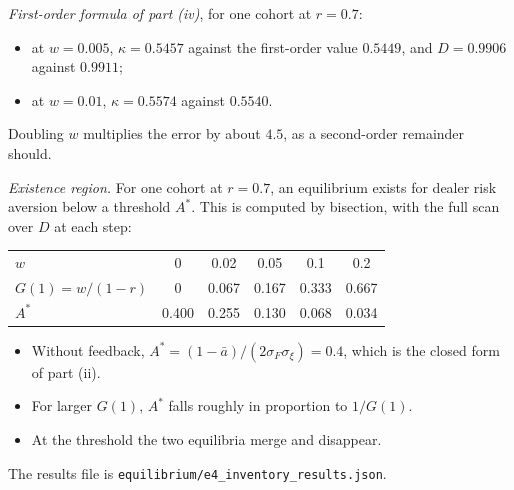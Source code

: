 \documentclass[12pt]{article}
\theoremstyle{definition}
\theoremstyle{remark}
\begin{document}
\emph{First-order formula of part (iv)}, for one cohort at $r=0.7$:
\begin{itemize}[itemsep=1pt,topsep=2pt]
\item at $w=0.005$, $\kappa=0.5457$ against the first-order value $0.5449$, and $D=0.9906$ against $0.9911$;
\item at $w=0.01$, $\kappa=0.5574$ against $0.5540$.
\end{itemize}
Doubling $w$ multiplies the error by about $4.5$, as a second-order remainder should.

\emph{Existence region.} For one cohort at $r=0.7$, an equilibrium exists for dealer risk aversion below a threshold $A^*$. This is computed by bisection, with the full scan over $D$ at each step:
\begin{center}\small
\begin{tabular}{lccccc}
\hline
$w$ & 0 & 0.02 & 0.05 & 0.1 & 0.2\\
$G(1)=w/(1-r)$ & 0 & 0.067 & 0.167 & 0.333 & 0.667\\
$A^*$ & 0.400 & 0.255 & 0.130 & 0.068 & 0.034\\
\hline
\end{tabular}
\end{center}
\begin{itemize}[itemsep=1pt,topsep=2pt]
\item Without feedback, $A^*=(1-\bar a)/(2\sigma_F\sigma_\xi)=0.4$, which is the closed form of part (ii).
\item For larger $G(1)$, $A^*$ falls roughly in proportion to $1/G(1)$.
\item At the threshold the two equilibria merge and disappear.
\end{itemize}
The results file is \nolinkurl{equilibrium/e4_inventory_results.json}.
\end{document}
